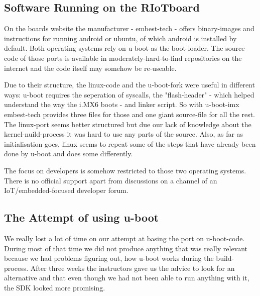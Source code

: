 \subsection{Software Running on the RIoTboard}
On the boards website the manufacturer - embest-tech - offers binary-images and
instructions for running android or ubuntu, of which android is installed by default.
Both operating systems rely on u-boot as the boot-loader. The source-code of those ports
is available in moderately-hard-to-find repositories on the internet and the code itself
may somehow be re-useable.

Due to their structure, the linux-code and the u-boot-fork were useful in different ways:
u-boot requires the seperation of syscalls, the "flash-header" - which helped understand
the way the i.MX6 boots - and linker script.
So with u-boot-imx embest-tech provides three files for those and one giant source-file
for all the rest.
The linux-port seems better structured but due our lack of knowledge about the
kernel-nuild-process it was hard to use any parts of the source.
Also, as far as initialisation goes, linux seems to repeat some of the steps that have
already been done by u-boot and does some differently.

The focus on developers is somehow restricted to those two operating systems. There is no
official support apart from discussions on a channel of an IoT/embedded-focused developer
forum.

\subsection{The Attempt of using u-boot}
We really lost a lot of time on our attempt at basing the port on u-boot-code.
During most of that time we did not produce anything that was really relevant because
we had problems figuring out, how u-boot works during the build-process.
After three weeks the instructors gave us the advice to look for an alternative and
that even though we had not been able to run anything with it, the SDK looked more
promising.
